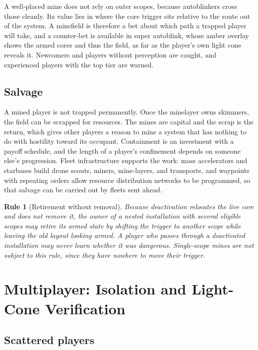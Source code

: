\documentclass[11pt]{article}
\newtheorem{designrule}{Rule}
\begin{document}
A well-placed mine does not rely on outer scopes, because autoblinkers cross those cleanly. Its value lies in where the core trigger sits relative to the route out of the system. A minefield is therefore a bet about which path a trapped player will take, and a counter-bet is available in super autoblink, whose amber overlay shows the armed cores and thus the field, as far as the player's own light cone reveals it. Newcomers and players without perception are caught, and experienced players with the top tier are warned.

\subsection{Salvage}

A mined player is not trapped permanently. Once the minelayer owns skimmers, the field can be scrapped for resources. The mines are capital and the scrap is the return, which gives other players a reason to mine a system that has nothing to do with hostility toward its occupant. Containment is an investment with a payoff schedule, and the length of a player's confinement depends on someone else's progression. Fleet infrastructure supports the work: mass accelerators and starbases build drone scouts, miners, mine-layers, and transports, and waypoints with repeating orders allow resource distribution networks to be programmed, so that salvage can be carried out by fleets sent ahead.

\begin{designrule}[Retirement without removal]
Because deactivation relocates the live core and does not remove it, the owner of a nested installation with several eligible scopes may retire its armed state by shifting the trigger to another scope while leaving the old layout looking armed. A player who passes through a deactivated installation may never learn whether it was dangerous. Single-scope mines are not subject to this rule, since they have nowhere to move their trigger.
\end{designrule}

\section{Multiplayer: Isolation and Light-Cone Verification}
\label{sec:multiplayer}

\subsection{Scattered players}
\end{document}
